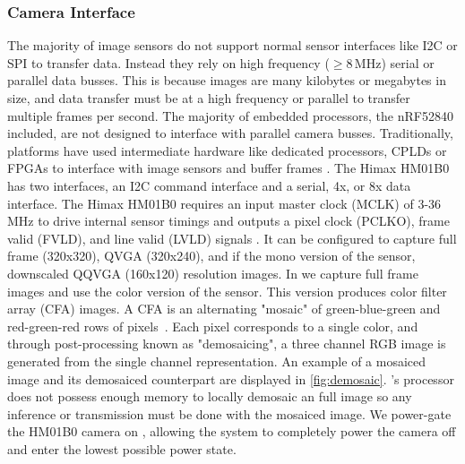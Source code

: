 \subsubsection{Camera Interface}
The majority of image sensors do not support normal sensor interfaces like I2C or SPI to transfer data. Instead they rely on high frequency ($\geq$8\,MHz) serial or parallel data busses. This is because images are many kilobytes or megabytes in size, and data transfer must be at a high frequency or parallel to transfer multiple frames per second. The majority of embedded processors, the nRF52840 included, are not designed to interface with parallel camera busses. Traditionally, platforms have used intermediate hardware like dedicated processors, CPLDs or FPGAs to interface with image sensors and buffer frames \cite{rowe2007firefly,rahimi2005cyclops}. The Himax HM01B0 has two interfaces, an I2C command interface and a serial, 4x, or 8x data interface.
The Himax HM01B0 requires an input master clock (MCLK) of 3-36\,MHz to drive internal sensor timings and outputs a pixel clock (PCLKO), frame valid (FVLD), and line valid (LVLD) signals \cite{hm01b0}. It can be configured to capture full frame (320x320), QVGA (320x240), and if the mono version of the sensor, downscaled QQVGA (160x120) resolution images. In \namec{} we capture full frame images and use the color version of the sensor. 
This version produces color filter array (CFA) images. 
A CFA is an alternating "mosaic" of green-blue-green and red-green-red rows of pixels~\cite{bayer1976color}. 
Each pixel corresponds to a single color, and through post-processing known as "demosaicing", a three channel RGB image is generated from the single channel representation. 
An example of a mosaiced image and its demosaiced counterpart are displayed in \cref{fig:demosaic}.
\namec{}'s processor does not possess enough memory to locally demosaic an full image so any inference or transmission must be done with the mosaiced image. 
We power-gate the HM01B0 camera on \namec, allowing the system to completely power the camera off and enter the lowest possible power state.


